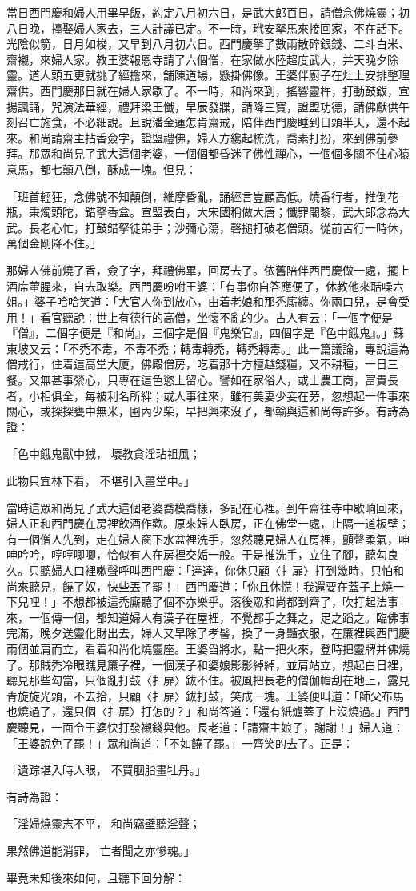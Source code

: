 當日西門慶和婦人用畢早飯，約定八月初六日，是武大郎百日，請僧念佛燒靈；初八日晚，擡娶婦人家去，三人計議已定。不一時，玳安拏馬來接回家，不在話下。光陰似箭，日月如梭，又早到八月初六日。西門慶拏了數兩散碎銀錢、二斗白米、齋襯，來婦人家。教王婆報恩寺請了六個僧，在家做水陸超度武大，并天晚夕除靈。道人頭五更就挑了經擔來，舖陳道場，懸掛佛像。王婆伴廚子在灶上安排整理齋供。西門慶那日就在婦人家歇了。不一時，和尚來到，搖響靈杵，打動鼓鈸，宣揚諷誦，咒演法華經，禮拜梁王懺，早辰發牃，請降三寶，證盟功德，請佛獻供午刻召亡施食，不必細說。且說潘金蓮怎肯齋戒，陪伴西門慶睡到日頭半天，還不起來。和尚請齋主拈香僉字，證盟禮佛，婦人方纔起梳洗，喬素打扮，來到佛前參拜。那眾和尚見了武大這個老婆，一個個都昏迷了佛性禪心，一個個多關不住心猿意馬，都七顛八倒，酥成一塊。但見：

「班首輕狂，念佛號不知顛倒，維摩昏亂，誦經言豈顧高低。燒香行者，推倒花瓶，秉燭頭陀，錯拏香盒。宣盟表白，大宋國稱做大唐；懺罪闍黎，武大郎念為大武。長老心忙，打鼓錯拏徒弟手；沙彌心蕩，磬搥打破老僧頭。從前苦行一時休，萬個金剛降不住。」

那婦人佛前燒了香，僉了字，拜禮佛畢，回房去了。依舊陪伴西門慶做一處，擺上酒席葷腥來，自去取樂。西門慶吩咐王婆：「有事你自答應便了，休教他來聒噪六姐。」婆子哈哈笑道：「大官人你到放心，由着老娘和那禿廝纏。你兩口兒，是會受用！」看官聽說：世上有德行的高僧，坐懷不亂的少。古人有云：「一個字便是『僧』，二個字便是『和尚』，三個字是個『鬼樂官』，四個字是『色中餓鬼』。」蘇東坡又云：「不禿不毒，不毒不禿；轉毒轉禿，轉禿轉毒。」此一篇議論，專說這為僧戒行，住着這高堂大廈，佛殿僧房，吃着那十方檀越錢糧，又不耕種，一日三餐。又無甚事縈心，只專在這色慾上留心。譬如在家俗人，或士農工商，富貴長者，小相俱全，每被利名所絆；或人事往來，雖有美妻少妾在旁，忽想起一件事來關心，或探探甕中無米，囤內少柴，早把興來沒了，都輸與這和尚每許多。有詩為證：

「色中餓鬼獸中狨，  壞教貪淫玷祖風；

此物只宜林下看，  不堪引入畫堂中。」

當時這眾和尚見了武大這個老婆喬模喬樣，多記在心裡。到午齋往寺中歇晌回來，婦人正和西門慶在房裡飲酒作歡。原來婦人臥房，正在佛堂一處，止隔一道板壁；有一個僧人先到，走在婦人窗下水盆裡洗手，忽然聽見婦人在房裡，顫聲柔氣，呻呻吟吟，哼哼唧唧，恰似有人在房裡交姤一般。于是推洗手，立住了腳，聽勾良久。只聽婦人口裡嗽聲呼叫西門慶：「達達，你休只顧〈扌扉〉打到幾時，只怕和尚來聽見，饒了奴，快些丟了罷！」西門慶道：「你且休慌！我還要在蓋子上燒一下兒哩！」不想都被這禿廝聽了個不亦樂乎。落後眾和尚都到齊了，吹打起法事來，一個傳一個，都知道婦人有漢子在屋裡，不覺都手之舞之，足之蹈之。臨佛事完滿，晚夕送靈化財出去，婦人又早除了孝髻，換了一身豔衣服，在簾裡與西門慶兩個並肩而立，看着和尚化燒靈座。王婆舀將水，點一把火來，登時把靈牌并佛燒了。那賊禿冷眼瞧見簾子裡，一個漢子和婆娘影影綽綽，並肩站立，想起白日裡，聽見那些勾當，只個亂打鼓〈扌扉〉鈸不住。被風把長老的僧伽帽刮在地上，露見青旋旋光頭，不去拾，只顧〈扌扉〉鈸打鼓，笑成一塊。王婆便叫道：「師父布馬也燒過了，還只個〈扌扉〉打怎的？」和尚答道：「還有紙爐蓋子上沒燒過。」西門慶聽見，一面令王婆快打發襯錢與他。長老道：「請齋主娘子，謝謝！」婦人道：「王婆說免了罷！」眾和尚道：「不如饒了罷。」一齊笑的去了。正是：

「遺踪堪入時人眼，  不買胭脂畫牡丹。」

有詩為證：

「淫婦燒靈志不平，  和尚竊壁聽淫聲；

果然佛道能消罪，  亡者聞之亦慘魂。」

畢竟未知後來如何，且聽下回分解：
